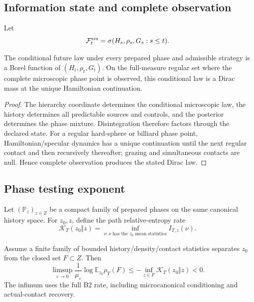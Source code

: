 \subsection{Information state and complete observation}

Let
\[
 {\mathcal F}^{\rm res}_t
 =\sigma(H_s,\rho_s,G_s: s\le t).
\]

\begin{proposition}
\label{prop:r5-c1-sufficiency}
The conditional future law under every prepared phase and admissible strategy
is a Borel function of \((H_t,\rho_t,G_t)\).  On the full-measure regular set
where the complete microscopic phase point is observed, this conditional law
is a Dirac mass at the unique Hamiltonian continuation.
\end{proposition}

\begin{proof}
The hierarchy coordinate determines the conditional microscopic law, the
history determines all predictable sources and controls, and the posterior
determines the phase mixture.  Disintegration therefore factors through the
declared state.  For a regular hard-sphere or billiard phase point,
Hamiltonian/specular dynamics has a unique continuation until the next
regular contact and then recursively thereafter; grazing and simultaneous
contacts are null.  Hence complete observation produces the stated Dirac law.
\end{proof}

\subsection{Phase testing exponent}

Let \((\mathbb P_z)_{z\in Z}\) be a compact family of prepared phases on the
same canonical history space.  For \(z_0,z\), define the path relative-entropy
rate
\[
 {\mathcal K}_T(z_0\Vert z)
 =
 \inf_{\nu:\nu\text{ has the }z_0\text{ mean statistics}}
 I_{T,z}(\nu).
\]

\begin{theorem}
\label{thm:r5-c1-testing}
Assume a finite family of bounded history/density/contact statistics separates
\(z_0\) from the closed set \(F\subset Z\).  Then
\[
 \limsup_{\varepsilon\to0}
 \frac1{\mu_\varepsilon}
 \log\mathbb E_{z_0}\rho_T(F)
 \le
 -\inf_{z\in F}{\mathcal K}_T(z_0\Vert z)<0.
\]
The infimum uses the full B2 rate, including microcanonical conditioning and
actual-contact recovery.
\end{theorem}

